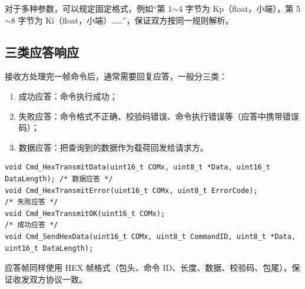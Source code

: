 对于多种参数，可以规定固定格式，例如“第 1$\sim$4 字节为 Kp（float，小端），第 5$\sim$8 字节为 Ki（float，小端）……”，保证双方按同一规则解析。

\subsection{三类应答响应}

接收方处理完一帧命令后，通常需要回复应答，一般分三类：

\begin{enumerate}
\item 成功应答：命令执行成功；
\item 失败应答：命令格式不正确、校验码错误、命令执行错误等（应答中携带错误码）；
\item 数据应答：把查询到的数据作为载荷回发给请求方。
\end{enumerate}

\begin{lstlisting}[style=c]
void Cmd_HexTransmitData(uint16_t COMx, uint8_t *Data, uint16_t DataLength); /* 数据应答 */
void Cmd_HexTransmitError(uint16_t COMx, uint8_t ErrorCode);                 /* 失败应答 */
void Cmd_HexTransmitOK(uint16_t COMx);                                       /* 成功应答 */
void Cmd_SendHexData(uint16_t COMx, uint8_t CommandID, uint8_t *Data, uint16_t DataLength);
\end{lstlisting}

应答帧同样使用 HEX 帧格式（包头、命令 ID、长度、数据、校验码、包尾），保证收发双方协议一致。

